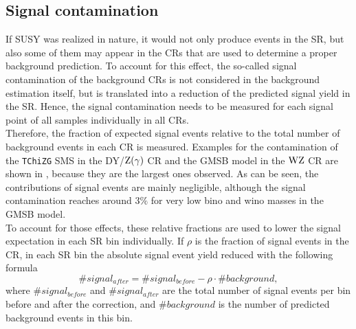 \subsection{Signal contamination}\label{sec:signalCont}
If SUSY was realized in nature, it would not only produce events in the SR, but also some of them may appear in the CRs that are used to determine a proper background prediction. To account for this effect, the so-called signal contamination of the background CRs is not considered in the background estimation itself, but is translated into a reduction of the predicted signal yield in the SR. Hence, the signal contamination needs to be measured for each signal point of all samples individually in all CRs.\\
Therefore, the fraction of expected signal events relative to the total number of background events in each CR is measured. Examples for the contamination of the \texttt{TChiZG} SMS in the DY/$\mathrm{Z}(\gamma)$ CR and the GMSB model in the $\mathrm{W}\mathrm{Z}$ CR are shown in , because they are the largest ones observed. As can be seen, the contributions of signal events are mainly negligible, although the signal contamination reaches around $3\%$ for very low bino and wino masses in the GMSB model.\\
To account for those effects, these relative fractions are used to lower the signal expectation in each SR bin individually. If $\rho$ is the fraction of signal events in the CR, in each SR bin the absolute signal event yield reduced with the following formula
\begin{equation}
 \#signal_{after} = \#signal_{before} - \rho\cdot\#background,
\end{equation}
where $\#signal_{before}$ and $\#signal_{after}$ are the total number of signal events per bin before and after the correction, and $\#background$ is the number of predicted background events in this bin.

